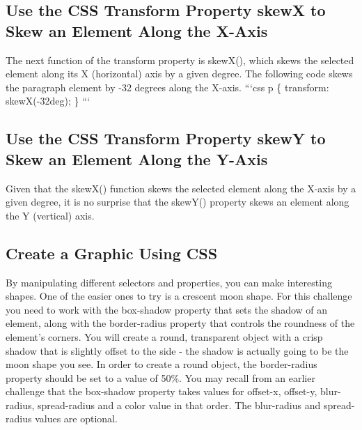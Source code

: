 \documentclass{article}%
\begin{document}
%
\subsection{Use the CSS Transform Property skewX to Skew an Element Along the X{-}Axis}%
\label{subsec:UsetheCSSTransformPropertyskewXtoSkewanElementAlongtheX{-}Axis}%
The next function of the transform property is skewX(), which skews the selected element along its X (horizontal) axis by a given degree.\newline%
The following code skews the paragraph element by {-}32 degrees along the X{-}axis.\newline%
```css\newline%
p \{\newline%
  transform: skewX({-}32deg);\newline%
\}\newline%
```\newline%

%
\subsection{Use the CSS Transform Property skewY to Skew an Element Along the Y{-}Axis}%
\label{subsec:UsetheCSSTransformPropertyskewYtoSkewanElementAlongtheY{-}Axis}%
Given that the skewX() function skews the selected element along the X{-}axis by a given degree, it is no surprise that the skewY() property skews an element along the Y (vertical) axis.\newline%

%
\subsection{Create a Graphic Using CSS}%
\label{subsec:CreateaGraphicUsingCSS}%
By manipulating different selectors and properties, you can make interesting shapes. One of the easier ones to try is a crescent moon shape. For this challenge you need to work with the box{-}shadow property that sets the shadow of an element, along with the border{-}radius property that controls the roundness of the element's corners.\newline%
You will create a round, transparent object with a crisp shadow that is slightly offset to the side {-} the shadow is actually going to be the moon shape you see.\newline%
In order to create a round object, the border{-}radius property should be set to a value of 50\%.\newline%
You may recall from an earlier challenge that the box{-}shadow property takes values for offset{-}x, offset{-}y, blur{-}radius, spread{-}radius and a color value in that order. The blur{-}radius and spread{-}radius values are optional.\newline%
\end{document}
